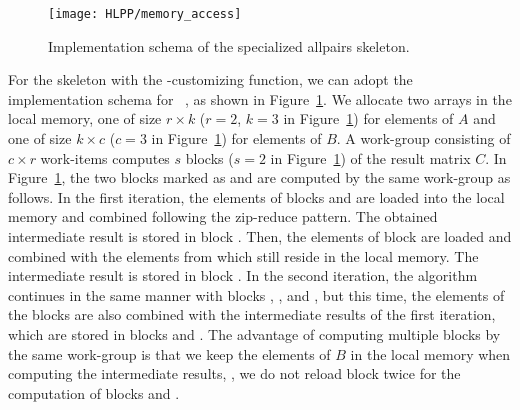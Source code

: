 \begin{figure}[b]
  \centering
  \texttt{[image: HLPP/memory\_access]}
  \caption{Implementation schema of the specialized allpairs skeleton.}
  \label{fig:memory_access}
\end{figure}
For the \allpairs skeleton with the \zip-\reduce customizing function, we can adopt the implementation schema for \GPUs~\cite{SarjeAl2013}, as shown in Figure~\ref{fig:memory_access}.
We allocate two arrays in the local memory, one of size $r\times k$ ($r=2$, $k=3$ in Figure~\ref{fig:memory_access}) for elements of $A$ and one of size $k\times c$ ($c=3$ in Figure~\ref{fig:memory_access}) for elements of $B$.
A work-group consisting of $c\times r$ work-items computes $s$ blocks ($s=2$ in Figure~\ref{fig:memory_access}) of the result matrix $C$.
In Figure~\ref{fig:memory_access}, the two blocks marked as  and  are computed by the same work-group as follows.
In the first iteration, the elements of blocks  and  are loaded into the local memory and combined following the zip-reduce pattern.
The obtained intermediate result is stored in block .
Then, the elements of block  are loaded and combined with the elements from  which still reside in the local memory.
The intermediate result is stored in block .
In the second iteration, the algorithm continues in the same manner with blocks , , and , but this time, the elements of the blocks are also combined with the intermediate results of the first iteration, which are stored in blocks  and .
The advantage of computing multiple blocks by the same work-group is that we keep the elements of $B$ in the local memory when computing the intermediate results, \ie, we do not reload block  twice for the computation of blocks  and .

